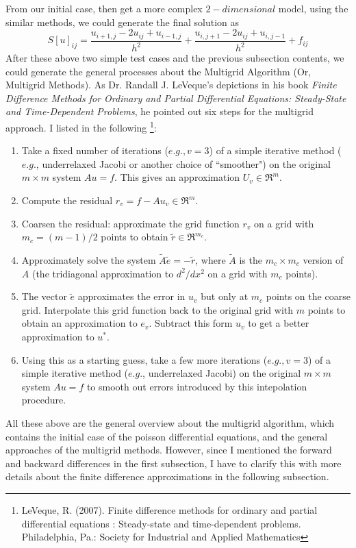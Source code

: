 \documentclass [a4paper, 12pt]{article}
\begin{document}
From our initial case, then get a more complex $2-dimensional$ model, using the similar methods, we could generate the final solution as \\
\begin {equation}
S[u]_{ij}= \frac {u_{i+1,j}-2u_{ij}+u_{i-1,j}}
                         {h^2}
                +
                \frac {u_{i,j+1}-2u_{ij}+u_{i,j-1}}
                         {h^2}
                +f_{ij}
\end {equation}
After these above two simple test cases and the previous subsection contents, we could generate the general processes about the Multigrid Algorithm (Or, Multigrid Methods). As Dr. Randall J. LeVeque's depictions in his book \emph {Finite Difference Methods for Ordinary and Partial Differential Equations: Steady-State and Time-Dependent Problems}, he pointed out six steps for the multigrid approach. I listed in the following \footnote {LeVeque, R. (2007). Finite difference methods for ordinary and partial differential equations : Steady-state and time-dependent problems. Philadelphia, Pa.: Society for Industrial and Applied Mathematics}: 
\begin {enumerate}
\item Take a fixed number of iterations ($e.g., v=3$) of a simple iterative method ($e.g.$, underrelaxed Jacobi or another choice of ``smoother") on the original 
$m \times m$ system $Au=f$. This gives an approximation $U_v \in \Re^m$. \\
\item Compute the residual $r_v=f-Au_v \in \Re^m$. \\
\item Coarsen the residual: approximate the grid function $r_v$ on a grid with $m_c=(m-1)/2$ points to obtain $\tilde{r} \in \Re^{m_c}$. \\
\item Approximately solve the system $\tilde{A} \tilde{e}=-\tilde{r}$, where $\tilde{A}$ is the $m_c \times m_c$ version of $A$ (the tridiagonal approximation to 
$d^2 / dx^2$ on a grid with $m_c$ points). \\
\item The vector $\tilde{e}$ approximates the error in $u_v$ but only at $m_c$ points on the coarse grid. Interpolate this grid function back to the original grid with 
$m$ points to obtain an approximation to $e_v$. Subtract this form $u_v$ to get a better approximation to $u^*$. \\
\item Using this as a starting guess, take a few more iterations ($e.g., v=3$) of a simple iterative method ($e.g.$, underrelaxed Jacobi) on the original $m \times m$ system $Au=f$ to smooth out errors introduced by this intepolation procedure. 
\end {enumerate}
All these above are the general overview about the multigrid algorithm, which contains the initial case of the poisson differential equations, and the general approaches of the multigrid methods. However, since I mentioned the forward and backward differences in the first subsection, I have to clarify this with more details about the finite difference approximations in the following subsection.
\end{document}
